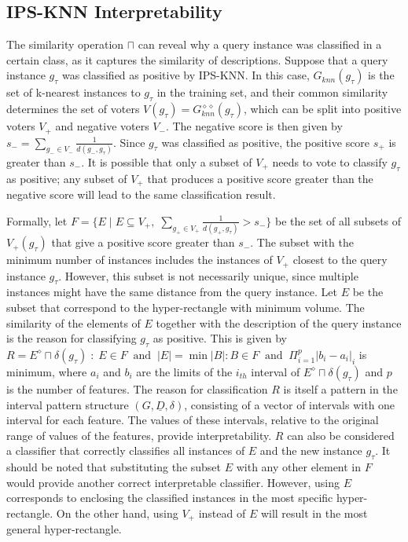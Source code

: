 \documentclass[
]{ceurart}
\begin{document}
\subsection{IPS-KNN Interpretability}
The similarity operation $\sqcap$ can reveal why a query instance was classified in a certain class, as it captures the similarity of descriptions. Suppose that a query instance $g_\tau$ was classified as positive by IPS-KNN. In this case, $G_{knn}(g_\tau)$ is the set of k-nearest instances to $g_\tau$ in the training set, and their common similarity determines the set of voters $V(g_\tau) = G_{knn}^{\diamond\diamond}(g_\tau)$, which can be split into positive voters $V_+$ and negative voters $V_-$. The negative score is then given by $s_- = \sum_{g_- \in V_-} \frac{1}{d(g_-, g_\tau)}$. Since $g_\tau$ was classified as positive, the positive score $s_+$ is greater than $s_-$. It is possible that only a subset of $V_+$ needs to vote to classify $g_\tau$ as positive; any subset of $V_+$ that produces a positive score greater than the negative score will lead to the same classification result.

Formally, let $F = \{ E \; | \; E \subseteq V_+, \; \sum_{g_+ \in V_+} \frac{1}{d(g_+, g_\tau)} > s_-\}$ be the set of all subsets of $V_+(g_\tau)$ that give a positive score greater than $s_-$. The subset with the minimum number of instances includes the instances of $V_+$ closest to the query instance $g_\tau$. However, this subset is not necessarily unique, since multiple instances might have the same distance from the query instance. Let $E$ be the subset that correspond to the hyper-rectangle with minimum volume. The similarity of the elements of $E$ together with the description of the query instance is the reason for classifying $g_\tau$ as positive. This is given by $R = E^\diamond \sqcap \delta(g_\tau) \; : \; E \in F \;\; \text{and} \;\; |E| = \min {|B| : B \in F} \;\; \text{and} \;\; \Pi_{i=1}^{p}|b_i - a_i|_i$ is minimum, where $a_i$ and $b_i$ are the limits of the $i_{th}$ interval of $E^\diamond \sqcap \delta(g_\tau)$ and $p$ is the number of features. The reason for classification $R$ is itself a pattern in the interval pattern structure $(G, \underline{D}, \delta)$, consisting of a vector of intervals with one interval for each feature. The values of these intervals, relative to the original range of values of the features, provide interpretability. $R$ can also be considered a classifier that correctly classifies all instances of $E$ and the new instance $g_\tau$. It should be noted that substituting the subset $E$ with any other element in $F$ would provide another correct interpretable classifier. However, using $E$ corresponds to enclosing the classified instances in the most specific hyper-rectangle. On the other hand, using $V_+$ instead of $E$ will result in the most general hyper-rectangle.
\end{document}
